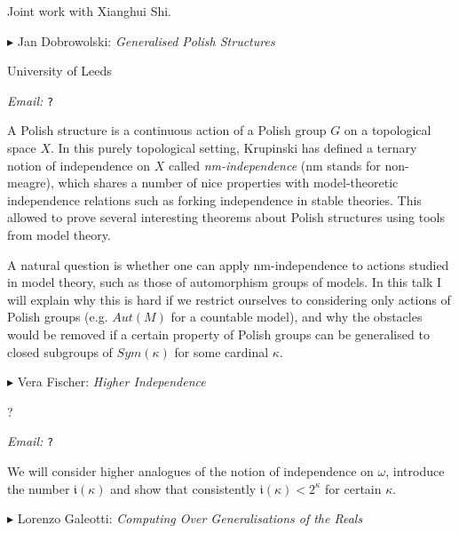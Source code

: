 \documentclass[a4paper]{amsart}
\theoremstyle{remark}
\newcommand{\vsp}{\vspace{20pt}}
\begin{document}
Joint work with Xianghui Shi.








\vsp 

\noindent 
$\blacktriangleright$ Jan Dobrowolski: \emph{Generalised Polish Structures} 

\noindent 
University of Leeds

\noindent 
\emph{Email:} \texttt{?} 

A Polish structure is a continuous action of a Polish group $G$ on a topological space $X$.
In this purely topological setting, Krupinski has defined a ternary notion of independence on $X$ called \emph{nm-independence} (nm stands for non-meagre), which shares a number of nice properties with model-theoretic independence relations such as forking independence in stable theories. This allowed to prove several interesting theorems about Polish structures using tools from model theory.

A natural question is whether one can apply nm-independence to actions studied in model theory, such as those of automorphism groups of models. In this talk I will explain why this is hard if we restrict ourselves to considering only actions of Polish groups (e.g. $Aut(M)$ for a countable model), and why the obstacles would be removed if a certain property of Polish groups can be generalised to closed subgroups of $Sym(\kappa)$ for some cardinal $\kappa$.








\vsp 

\noindent 
$\blacktriangleright$ Vera Fischer: \emph{Higher Independence} 

\noindent 
? 

\noindent 
\emph{Email:} \texttt{?}

We will consider higher analogues of the notion of 
independence on $\omega$, introduce the number $\mathfrak{i}(\kappa)$ 
and show that consistently $\mathfrak{i}(\kappa)<2^\kappa$ for certain 
$\kappa$.












\vsp 

\noindent 
$\blacktriangleright$ Lorenzo Galeotti: \emph{Computing Over Generalisations of the Reals} 
\end{document}
